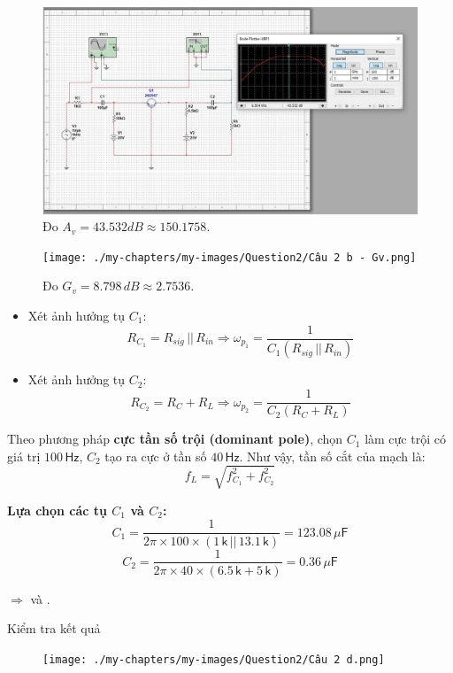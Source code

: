 \begin{figure}[H]
	\centering
	\includegraphics[width=\linewidth]{./my-chapters/my-images/Question2/Câu 2 b - Sóng và Av.png}
	\caption{Đo $A_{v} = 43.532dB \approx 150.1758$.}
\end{figure}

\begin{figure}[H]
	\centering
	\texttt{[image: ./my-chapters/my-images/Question2/Câu 2 b - Gv.png]}
	\caption{Đo $G_{v} = 8.798\, dB \approx 2.7536$.}
\end{figure}


\begin{itemize}[label=-]
	\item Xét ảnh hưởng tụ $C_{1}$: 
	\[
	R_{C_{1}} = R_{sig} \,||\, R_{in}
	\Longrightarrow 
	\omega_{p_{1}} = \frac{1}{C_{1}\left(R_{sig} \,||\, R_{in}\right)}
	\]
	
	\item Xét ảnh hưởng tụ $C_{2}$: 
	\[
	R_{C_{2}} = R_{C} + R_{L}
	\Longrightarrow 
	\omega_{p_{2}} = \frac{1}{C_{2}\left(R_{C} + R_{L}\right)}
	\]
\end{itemize}

Theo phương pháp \textbf{cực tần số trội (dominant pole)}, chọn $C_{1}$ làm cực trội có giá trị $100\,\textsf{Hz}$, 
$C_{2}$ tạo ra cực ở tần số $40\,\textsf{Hz}$.  
Như vậy, tần số cắt của mạch là:
\[
f_{L} = \sqrt{f_{C_{1}}^{2} + f_{C_{2}}^{2}}
\]

\textbf{Lựa chọn các tụ $C_{1}$ và $C_{2}$:}
\[
C_{1} = \frac{1}{2\pi \times 100 \times (1\,\textsf{k}\,||\,13.1\,\textsf{k})}
= 123.08\,\mu\textsf{F}
\]
\[
C_{2} = \frac{1}{2\pi \times 40 \times (6.5\,\textsf{k} + 5\,\textsf{k})}
= 0.36\,\mu\textsf{F}
\]

$\Rightarrow$  và .

Kiểm tra kết quả

\begin{figure}[H]
	\centering
	\texttt{[image: ./my-chapters/my-images/Question2/Câu 2 d.png]}
\end{figure}
